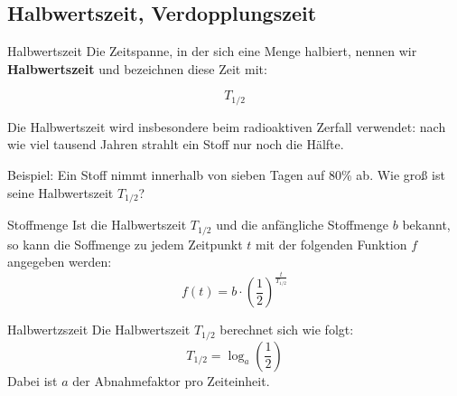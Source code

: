 \newpage



\newpage

\subsection{Halbwertszeit, Verdopplungszeit}

\begin{definition}{Halbwertszeit}{}
Die Zeitspanne, in der sich eine Menge halbiert, nennen wir
\textbf{Halbwertszeit} und bezeichnen diese Zeit mit:

$$T_{1/2}$$
\end{definition}

Die Halbwertszeit wird insbesondere
  beim radioaktiven Zerfall verwendet: nach wie viel tausend Jahren strahlt
  ein Stoff nur noch die Hälfte.


Beispiel: Ein Stoff nimmt innerhalb von sieben Tagen auf 80\% ab. Wie
groß ist seine Halbwertszeit $T_{1/2}$?


\begin{gesetz}{Stoffmenge}{}
  Ist die Halbwertszeit $T_{1/2}$ und die anfängliche Stoffmenge $b$
  bekannt, so kann die Soffmenge zu jedem Zeitpunkt $t$ mit der
  folgenden Funktion $f$ angegeben werden:
  $$f(t) = b\cdot{}\left(\frac12\right)^\frac{t}{T_{1/2}}$$
\end{gesetz}
\newpage
  
\begin{gesetz}{Halbwertzszeit}{}
  Die Halbwertszeit $T_{1/2}$ berechnet sich wie folgt:
  $$T_{1/2} = \log_a\left(\frac12\right)$$
  Dabei ist $a$ der Abnahmefaktor pro Zeiteinheit.
\end{gesetz}



